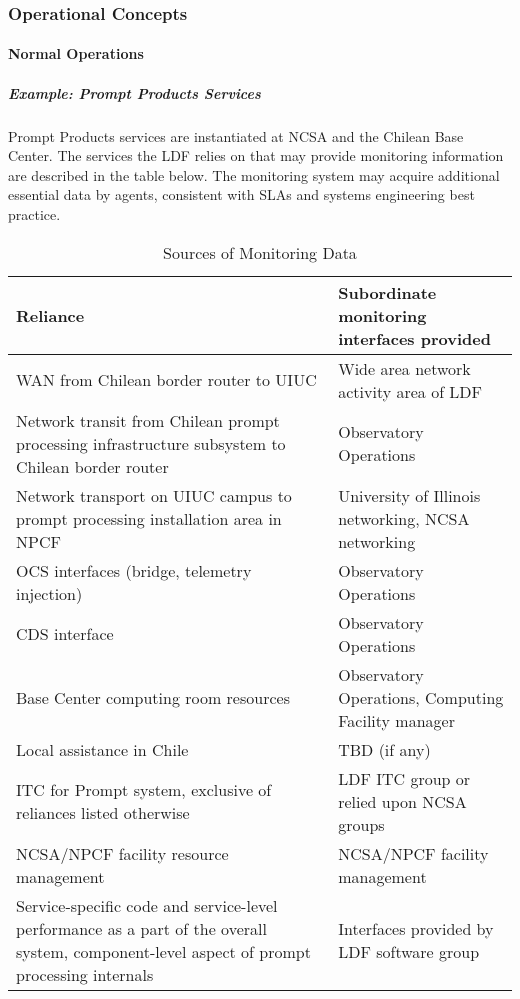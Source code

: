 \subsubsection{Operational Concepts}

\paragraph{Normal Operations}

\subparagraph{Example: Prompt Products Services}

Prompt Products services are instantiated at NCSA and the Chilean Base Center. The
services the LDF relies on that may provide monitoring information are described
in the table below. The monitoring system may acquire additional essential data
by agents, consistent with SLAs and systems engineering best practice.

\begin{longtable}{|p{}|p{}|}
\caption{Sources of Monitoring Data} \\\hline
\textbf{Reliance} & \textbf{Subordinate monitoring interfaces provided} \\\hline
WAN from Chilean border router to UIUC & Wide area network activity area of LDF \\\hline
Network transit from Chilean prompt processing  infrastructure subsystem to Chilean border router & Observatory Operations \\\hline
Network transport on UIUC campus to prompt processing installation area in NPCF & University of Illinois networking, NCSA networking \\\hline
OCS interfaces (bridge, telemetry injection) & Observatory Operations \\\hline
CDS interface & Observatory Operations \\\hline
Base Center computing room resources & Observatory Operations, Computing Facility manager \\\hline
Local assistance in Chile & TBD (if any) \\\hline
ITC for Prompt system, exclusive of reliances listed otherwise & LDF ITC group or relied upon NCSA groups \\\hline
NCSA/NPCF facility resource management & NCSA/NPCF facility management \\\hline
Service-specific code and service-level performance as a part of the overall system, component-level aspect of prompt processing internals & Interfaces provided by LDF software group \\\hline
\end{longtable}


